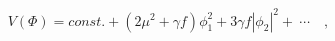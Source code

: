 \begin{equation}
V(\Phi) = const. + (2\mu^2 + \gamma f)\phi_1^2 + 3\gamma f|\phi_2|^2
+~\cdots\quad,
\end{equation}

